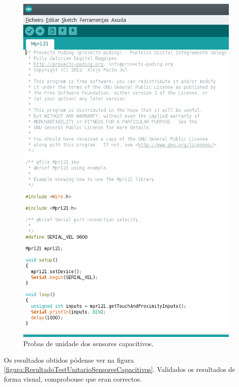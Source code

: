   \begin{figure}[htbp]
   \centering
   \includegraphics[scale=0.8,keepaspectratio=true]{./imagenes/test-sensores-capacitivos.png}
   \caption{Probas de unidade dos sensores capacitivos.}
   \label{figura:TestUnitarioSensoresCapacitivos}
  \end{figure}
  
  Os resultados obtidos pódense ver na figura
  \ref{figura:ResultadoTestUnitarioSensoresCapacitivos}. Validados os resultados
  de forma visual, comprobouse que eran correctos. \\
  
